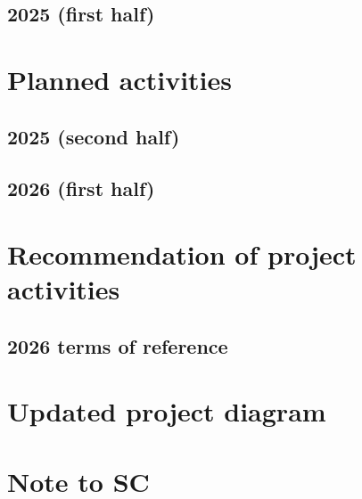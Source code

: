 \documentclass{SCreport}
\begin{document}
\subsection{2025 (first half)}

\section{Planned activities}

\subsection{2025 (second half)}

\subsection{2026 (first half)}

\section{Recommendation of project activities}

\subsection{2026 terms of reference}

\section{Updated project diagram}

\section{Note to SC}
\end{document}
